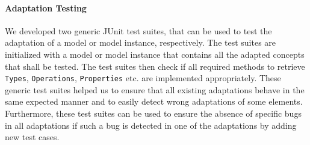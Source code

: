 	\paragraph{Adaptation Testing}
	We developed two generic JUnit test suites, 
	that can be used to test the adaptation of a model 
	or model instance, respectively. 
	The test suites are initialized with a model or model instance that
	contains all the adapted concepts that shall be tested.
	The test suites then check if all required methods to 
	retrieve \texttt{Types}, \texttt{Operations}, \texttt{Properties} etc. are implemented 
	appropriately. These generic test suites helped us to ensure 
	that all existing adaptations behave in the same expected manner
	and to easily detect wrong adaptations of some elements.
	Furthermore, these test suites can be used to ensure the absence of specific
	bugs in all adaptations if such a bug is detected in one of the adaptations by adding new test cases.